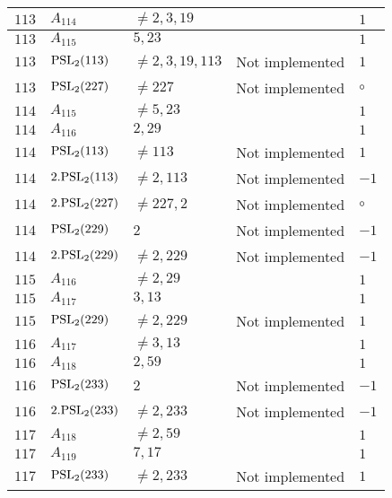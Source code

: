 \documentclass[a4paper, 11pt]{article}
\begin{document}
\begin{longtable}{lllll}
        $ 113 $ & $ A_{114} $ & $ \neq 2, 3, 19 $ & $ ~ $ & $ 1  $ \\ \hline
        $ 113 $ & $ A_{115} $ & $ 5, 23 $ & $ ~ $ & $ 1  $ \\ \hline
        $ 113 $ & $ {\rm PSL}_{2}(113) $ & $ \neq 2, 3, 19, 113 $ & Not implemented & $ 1  $ \\ \hline
        $ 113 $ & $ {\rm PSL}_{2}(227) $ & $ \neq 227 $ & Not implemented & $\circ$ \\ \hline
        $ 114 $ & $ A_{115} $ & $ \neq 5, 23 $ & $ ~ $ & $ 1  $ \\ \hline
        $ 114 $ & $ A_{116} $ & $ 2, 29 $ & $ ~ $ & $ 1  $ \\ \hline
        $ 114 $ & $ {\rm PSL}_{2}(113) $ & $ \neq 113 $ & Not implemented & $ 1  $ \\ \hline
        $ 114 $ & $ 2.{\rm PSL}_{2}(113) $ & $ \neq 2, 113 $ & Not implemented & $ -1  $ \\ \hline
        $ 114 $ & $ 2.{\rm PSL}_{2}(227) $ & $ \neq 227, 2 $ & Not implemented & $\circ$ \\ \hline
        $ 114 $ & $ {\rm PSL}_{2}(229) $ & $ 2 $ & Not implemented & $ -1  $ \\ \hline
        $ 114 $ & $ 2.{\rm PSL}_{2}(229) $ & $ \neq 2, 229 $ & Not implemented & $ -1  $ \\ \hline
        $ 115 $ & $ A_{116} $ & $ \neq 2, 29 $ & $ ~ $ & $ 1  $ \\ \hline
        $ 115 $ & $ A_{117} $ & $ 3, 13 $ & $ ~ $ & $ 1  $ \\ \hline
        $ 115 $ & $ {\rm PSL}_{2}(229) $ & $ \neq 2, 229 $ & Not implemented & $ 1  $ \\ \hline
        $ 116 $ & $ A_{117} $ & $ \neq 3, 13 $ & $ ~ $ & $ 1  $ \\ \hline
        $ 116 $ & $ A_{118} $ & $ 2, 59 $ & $ ~ $ & $ 1  $ \\ \hline
        $ 116 $ & $ {\rm PSL}_{2}(233) $ & $ 2 $ & Not implemented & $ -1  $ \\ \hline
        $ 116 $ & $ 2.{\rm PSL}_{2}(233) $ & $ \neq 2, 233 $ & Not implemented & $ -1  $ \\ \hline
        $ 117 $ & $ A_{118} $ & $ \neq 2, 59 $ & $ ~ $ & $ 1  $ \\ \hline
        $ 117 $ & $ A_{119} $ & $ 7, 17 $ & $ ~ $ & $ 1  $ \\ \hline
        $ 117 $ & $ {\rm PSL}_{2}(233) $ & $ \neq 2, 233 $ & Not implemented & $ 1  $ \\ \hline

\end{longtable}
\end{document}
